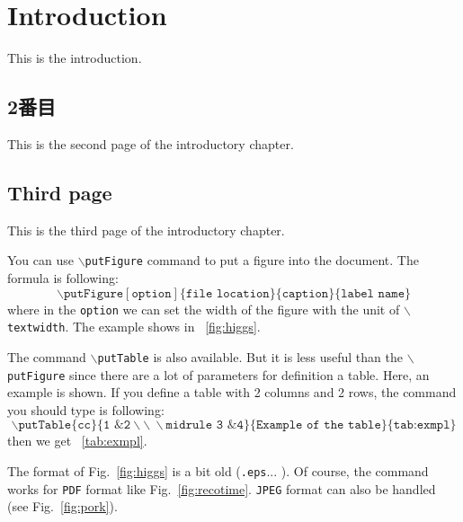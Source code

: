 \chapter{Introduction}
This is the introduction. 
\newpage
\section{2番目}
This is the second page of the introductory chapter. 
\newpage
\section{Third page}
This is the third page of the introductory chapter.

You can use \texttt{$\backslash$putFigure} command to put a figure into the document. 
The formula is following: 
\begin{equation}
\backslash\texttt{putFigure}[\texttt{option}]\{\texttt{file location}\}
\{\texttt{caption}\}\{\texttt{label name}\}
\end{equation}
where in the \texttt{option} we can set the width of the figure with the unit of \texttt{$\backslash$textwidth}. 
The example shows in \figurename~\ref{fig:higgs}. 

The command \texttt{$\backslash$putTable} is also available. 
But it is less useful than the \texttt{$\backslash$putFigure} 
since there are a lot of parameters for definition a table.
Here, an example is shown. 
If you define a table with 2 columns and 2 rows, the command you should 
type is following: 
\begin{equation}
\backslash\texttt{putTable}\{\texttt{cc}\}
\{\texttt{1 \& 2}\backslash\backslash\ \backslash\texttt{midrule 3 \& 4}\}
\{\texttt{Example of the table}\}\{\texttt{tab:exmpl}\}
\end{equation}
then we get \tablename~\ref{tab:exmpl}. 

The format of Fig.~\ref{fig:higgs} is a bit old (\texttt{.eps}... ). Of course, the command works for \texttt{PDF} format like Fig.~\ref{fig:recotime}. 
\texttt{JPEG} format can also be handled (see Fig.~\ref{fig:pork}). 

